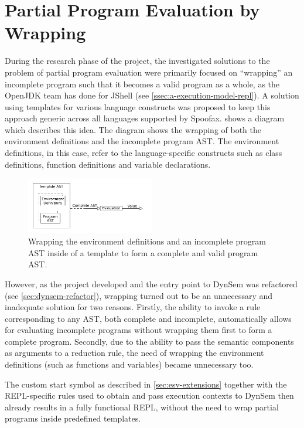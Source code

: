 \section{Partial Program Evaluation by Wrapping}
\label{sec:wrapping}

During the research phase of the project, the investigated solutions to the
problem of partial program evaluation were primarily focused on ``wrapping'' an
incomplete program such that it becomes a valid program as a whole, as the
OpenJDK team has done for JShell (see \cref{ssec:a-execution-model-repl}). A
solution using templates for various language constructs was proposed to keep
this approach generic across all languages supported by Spoofax.
 shows a diagram which describes this idea. The diagram shows
the wrapping of both the environment definitions and the incomplete program AST.
The environment definitions, in this case, refer to the language-specific
constructs such as class definitions, function definitions and variable
declarations.

\begin{figure}[b]
  \centering
  \includegraphics[width=0.5\textwidth]{wrapping}
  \caption{Wrapping the environment definitions and an incomplete program AST
    inside of a template to form a complete and valid program AST.}
  \label{fig:wrapping}
\end{figure}

However, as the project developed and the entry point to DynSem was refactored
(see \cref{sec:dynsem-refactor}), wrapping turned out to be an
unnecessary and inadequate solution for two reasons. Firstly, the ability to
invoke a rule corresponding to any AST, both complete and incomplete,
automatically allows for evaluating incomplete programs without wrapping them
first to form a complete program. Secondly, due to the ability to pass the
semantic components as arguments to a reduction rule, the need of wrapping the
environment definitions (such as functions and variables) became unnecessary
too.

The custom start symbol as described in \cref{sec:esv-extensions} together with
the REPL-specific rules used to obtain and pass execution contexts to DynSem
then already results in a fully functional REPL, without the need to wrap
partial programs inside predefined templates.

